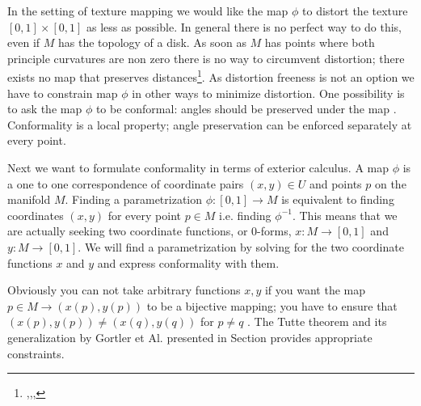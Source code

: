 	
In the setting of texture mapping we would like the map $\phi$ to distort the texture $[0,1]\times [0,1]$ as less as possible. In general there is no perfect way to do this, even if $M$ has the topology of a disk. As soon as $M$ has points where both principle curvatures are non zero there is no way to circumvent distortion; there exists no map that preserves distances\footnote{,,,}. As distortion freeness is not an option we have to constrain map $\phi$ in other ways to minimize distortion. One possibility is to ask the map $\phi$ to be conformal: angles should be preserved under the map . Conformality is a local property; angle preservation can be enforced separately at every point. %

Next we want to formulate conformality in terms of exterior calculus. A map $\phi$ is a one to one correspondence of coordinate pairs $(x,y) \in U$ and points $p$ on the manifold $M$. Finding a parametrization $\phi:[0,1] \to M$ is equivalent to finding coordinates $(x,y)$ for every point $p\in M$ i.e. finding $\phi^{-1}$. This means that we are actually seeking two coordinate functions, or 0-forms, $x: M \to [0,1]$ and $y: M \to [0,1]$. We will find a parametrization by solving for the two coordinate functions $x$ and $y$ and express conformality with them.  

Obviously you can not take arbitrary functions $x,y$ if you want the map $p\in M \to (x(p),y(p))$ to be a bijective mapping; you have to ensure that $(x(p),y(p)) \neq (x(q),y(q))$ for $p\neq q$ . The Tutte theorem and its generalization by Gortler et Al. presented in Section  provides appropriate constraints.


